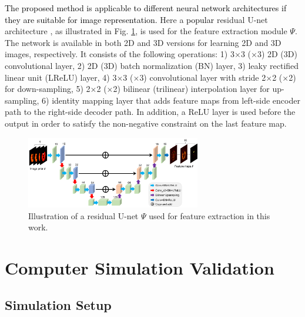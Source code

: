 \documentclass[]{IEEETran}
\newcommand{\txtb}[1]{\textcolor{black}{#1}}
\begin{document}
	\txtb{The proposed method is applicable to different neural network architectures if they are suitable for image representation.} Here a \txtb{popular}  residual U-net architecture \cite{Gong2019}, as illustrated in Fig. \ref{fig:Unet}, is used for the feature extraction module $\Psi$. The network is available in both 2D and 3D versions for learning 2D and 3D images, respectively. It consists of the following operations: 1) 3$\times$3 ($\times$3) 2D (3D) convolutional layer, 2) 2D (3D) batch normalization (BN) layer, 3) leaky rectified linear unit (LReLU) layer, 4) 3$\times$3 ($\times$3) convolutional layer with stride 2$\times$2 ($\times$2) for down-sampling, 5) 2$\times$2 ($\times$2) bilinear (trilinear) interpolation layer for up-sampling, 6) identity mapping layer that adds feature maps from left-side encoder path to the right-side decoder path. In addition, a ReLU layer is used before the output in order to satisfy the non-negative constraint on the last feature map.
	
	
	\begin{figure}[t]
		\centering
		\includegraphics[trim=2cm 0cm 2cm 0cm, width=3in]{Unet.png}
		\caption{Illustration of a residual U-net $\Psi$ used for feature extraction in this work.}
		\label{fig:Unet}	
	\end{figure}
	
	
	\section{Computer Simulation Validation}
	
	\subsection{Simulation Setup}
	
\end{document}
